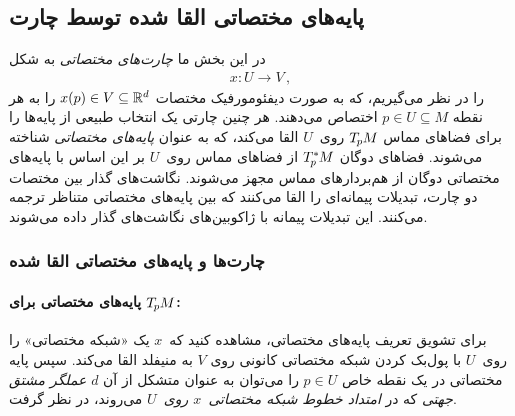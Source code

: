 \subsection{پایه‌های مختصاتی القا شده توسط چارت}
\label{apx:chart_induced_bases_main}

در این بخش ما \emph{چارت‌های مختصاتی} به شکل
\begin{align}
	x: U \to V \,,
\end{align}
را در نظر می‌گیریم، که به صورت دیفئومورفیک مختصات $x(p) \in V \subseteq \mathbb{R}^d$ را به هر نقطه $p \in U \subseteq M$ اختصاص می‌دهند.
هر چنین چارتی یک انتخاب طبیعی از پایه‌ها را برای فضاهای مماس $T_{\mkern-1.5mu p}\mkern-.5muM$ روی~$U$ القا می‌کند، که به عنوان \emph{پایه‌های مختصاتی} شناخته می‌شوند.
فضاهای دوگان $T_{\mkern-1.5mu p}^{\mkern-0mu *}\mkern-1muM$ از فضاهای مماس روی~$U$ بر این اساس با پایه‌های مختصاتی دوگان از هم‌بردارهای مماس مجهز می‌شوند.
نگاشت‌های گذار بین مختصات دو چارت، تبدیلات پیمانه‌ای را القا می‌کنند که بین پایه‌های مختصاتی متناظر ترجمه می‌کنند.
این تبدیلات پیمانه با ژاکوبین‌های نگاشت‌های گذار داده می‌شوند.




\subsubsection{چارت‌ها و پایه‌های مختصاتی القا شده}
\label{apx:coord_basis_def}

\paragraph{پایه‌های مختصاتی برای $T_{\mkern-1.5mu p}\mkern-.5muM$:}
برای تشویق تعریف پایه‌های مختصاتی، مشاهده کنید که~$x$ یک «شبکه مختصاتی» را روی~$U$ با پول‌بک کردن شبکه مختصاتی کانونی روی $V$ به منیفلد القا می‌کند.
سپس پایه مختصاتی در یک نقطه خاص $p \in U$ را می‌توان به عنوان متشکل از آن $d$ \emph{عملگر مشتق جهتی} که در \emph{امتداد خطوط شبکه مختصاتی~$x$ روی~$U$} می‌روند، در نظر گرفت.

